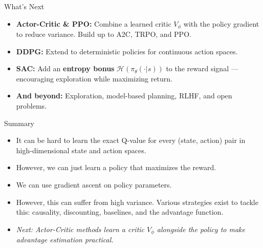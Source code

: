 \begin{frame}{What's Next}
    \begin{itemize}
        \item \textbf{Actor-Critic \& PPO:} Combine a learned critic $V_\phi$ with the policy gradient to reduce variance. Build up to A2C, TRPO, and PPO.
        \item \textbf{DDPG:} Extend to deterministic policies for continuous action spaces.
        \item \textbf{SAC:} Add an \textbf{entropy bonus} $\mathcal{H}(\pi_\theta(\cdot|s))$ to the reward signal --- encouraging exploration while maximizing return.
        \item \textbf{And beyond:} Exploration, model-based planning, RLHF, and open problems.
    \end{itemize}
\end{frame}

\begin{frame}{Summary}
\begin{itemize}
    \item It can be hard to learn the exact Q-value for every (state, action) pair in high-dimensional state and action spaces.
    \item However, we can just learn a policy that maximizes the reward.
    \item We can use gradient ascent on policy parameters.
    \item However, this can suffer from high variance. Various strategies exist to tackle this: causality, discounting, baselines, and the advantage function.
    \item \textit{Next: Actor-Critic methods learn a critic $V_\phi$ alongside the policy to make advantage estimation practical.}
\end{itemize}
\end{frame}